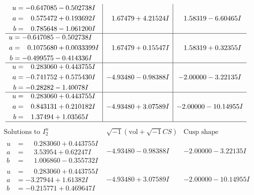 \documentclass[1p]{elsarticle_modified}
\theoremstyle{definition}
\newcommand{\I}{\sqrt{-1}}
\begin{document}
$$\begin{array}{c|c|c}
\begin{aligned}
u &= -0.647085 - 0.502738 I \\
a &= \phantom{-}0.575472 + 0.193692 I \\
b &= \phantom{-}0.785648 - 1.061200 I\end{aligned}
 & \phantom{-}1.67479 + 4.21524 I & \phantom{-}1.58319 - 6.60465 I \\ \hline\begin{aligned}
u &= -0.647085 - 0.502738 I \\
a &= \phantom{-}0.1075680 + 0.0033399 I \\
b &= -0.499575 - 0.414336 I\end{aligned}
 & \phantom{-}1.67479 + 0.15547 I & \phantom{-}1.58319 + 0.32355 I \\ \hline\begin{aligned}
u &= \phantom{-}0.283060 + 0.443755 I \\
a &= -0.741752 + 0.575430 I \\
b &= -0.28282 - 1.40078 I\end{aligned}
 & -4.93480 - 0.98388 I & -2.00000 - 3.22135 I \\ \hline\begin{aligned}
u &= \phantom{-}0.283060 + 0.443755 I \\
a &= \phantom{-}0.843131 + 0.210182 I \\
b &= \phantom{-}1.37494 + 1.03565 I\end{aligned}
 & -4.93480 + 3.07589 I & -2.00000 - 10.14955 I\\
 \hline 
 \end{array}$$\newpage$$\begin{array}{c|c|c}  
\text{Solutions to }I^u_{2}& \I (\text{vol} + \sqrt{-1}CS) & \text{Cusp shape}\\
 \hline 
\begin{aligned}
u &= \phantom{-}0.283060 + 0.443755 I \\
a &= \phantom{-}3.53954 + 0.62247 I \\
b &= \phantom{-}1.006860 - 0.355732 I\end{aligned}
 & -4.93480 - 0.98388 I & -2.00000 - 3.22135 I \\ \hline\begin{aligned}
u &= \phantom{-}0.283060 + 0.443755 I \\
a &= -3.27944 + 1.61382 I \\
b &= -0.215771 + 0.469647 I\end{aligned}
 & -4.93480 + 3.07589 I & -2.00000 - 10.14955 I \\ \hline\begin{aligned}

\end{aligned}
\end{array}$$
\end{document}
